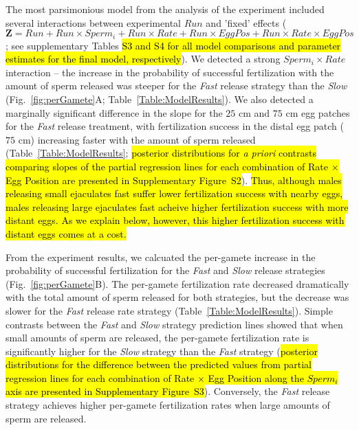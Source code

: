 \documentclass{article}
\begin{document}
	The most parsimonious model from the analysis of the  experiment included several interactions between experimental $Run$ and 'fixed' effects ($\mathbf{Z} = Run + Run \times Sperm_i + Run \times Rate + Run \times EggPos + Run \times Rate \times EggPos$; see supplementary Tables \hl{S3 and S4 for all model comparisons and parameter estimates for the final model, respectively}). We detected a strong $Sperm_i \times Rate$ interaction -- the increase in the probability of successful fertilization with the amount of sperm released was steeper for the \textit{Fast} release strategy than the \textit{Slow} (Fig.~\ref{fig:perGamete}A; Table~\ref{Table:ModelResults}). We also detected a marginally significant difference in the slope for the $25$ cm and $75$ cm egg patches for the \textit{Fast} release treatment, with fertilization success in the distal egg patch ($75$ cm) increasing faster with the amount of sperm released (Table~\ref{Table:ModelResults}; \hl{posterior distributions for \textit{a priori} contrasts comparing slopes of the partial regression lines for each combination of Rate $\times$ Egg Position are presented in Supplementary Figure~S2}). \hl{Thus, although males releasing small ejaculates fast suffer lower fertilization success with nearby eggs, males releasing large ejaculates fast acheive higher fertilization success with more distant eggs. As we explain below, however, this higher fertilization success with distant eggs comes at a cost.}

	From the  experiment results, we calcuated the per-gamete increase in the probability of successful fertilization for the \textit{Fast} and \textit{Slow} release strategies (Fig.~\ref{fig:perGamete}B). The per-gamete fertilization rate decreased dramatically with the total amount of sperm released for both strategies, but the decrease was slower for the \textit{Fast} release rate strategy (Table~\ref{Table:ModelResults}). Simple contrasts between the \textit{Fast} and \textit{Slow} strategy prediction lines showed that when small amounts of sperm are released, the per-gamete fertilization rate is significantly higher for the \textit{Slow} strategy than the \textit{Fast} strategy (\hl{posterior distributions for the difference between the predicted values from partial regression lines for each combination of Rate $\times$ Egg Position along the $Sperm_i$ axis are presented in Supplementary Figure~S3}). Conversely, the \textit{Fast} release strategy achieves higher per-gamete fertilization rates when large amounts of sperm are released.
\end{document}
